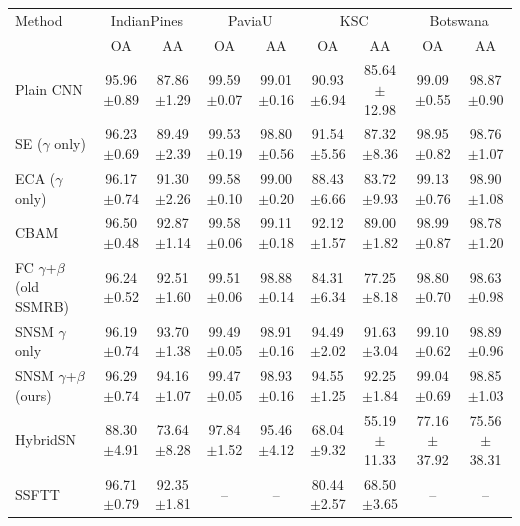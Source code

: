 \begin{tabular}{lcccccccc}
\toprule
Method & \multicolumn{2}{c}{IndianPines} & \multicolumn{2}{c}{PaviaU} & \multicolumn{2}{c}{KSC} & \multicolumn{2}{c}{Botswana} \\
 & OA & AA & OA & AA & OA & AA & OA & AA \\
\midrule
Plain CNN & 95.96$\pm$0.89 & 87.86$\pm$1.29 & 99.59$\pm$0.07 & 99.01$\pm$0.16 & 90.93$\pm$6.94 & 85.64$\pm$12.98 & 99.09$\pm$0.55 & 98.87$\pm$0.90 \\
SE ($\gamma$ only) & 96.23$\pm$0.69 & 89.49$\pm$2.39 & 99.53$\pm$0.19 & 98.80$\pm$0.56 & 91.54$\pm$5.56 & 87.32$\pm$8.36 & 98.95$\pm$0.82 & 98.76$\pm$1.07 \\
ECA ($\gamma$ only) & 96.17$\pm$0.74 & 91.30$\pm$2.26 & 99.58$\pm$0.10 & 99.00$\pm$0.20 & 88.43$\pm$6.66 & 83.72$\pm$9.93 & 99.13$\pm$0.76 & 98.90$\pm$1.08 \\
CBAM & 96.50$\pm$0.48 & 92.87$\pm$1.14 & 99.58$\pm$0.06 & 99.11$\pm$0.18 & 92.12$\pm$1.57 & 89.00$\pm$1.82 & 98.99$\pm$0.87 & 98.78$\pm$1.20 \\
FC $\gamma$+$\beta$ (old SSMRB) & 96.24$\pm$0.52 & 92.51$\pm$1.60 & 99.51$\pm$0.06 & 98.88$\pm$0.14 & 84.31$\pm$6.34 & 77.25$\pm$8.18 & 98.80$\pm$0.70 & 98.63$\pm$0.98 \\
SNSM $\gamma$ only & 96.19$\pm$0.74 & 93.70$\pm$1.38 & 99.49$\pm$0.05 & 98.91$\pm$0.16 & 94.49$\pm$2.02 & 91.63$\pm$3.04 & 99.10$\pm$0.62 & 98.89$\pm$0.96 \\
SNSM $\gamma$+$\beta$ (ours) & 96.29$\pm$0.74 & 94.16$\pm$1.07 & 99.47$\pm$0.05 & 98.93$\pm$0.16 & 94.55$\pm$1.25 & 92.25$\pm$1.84 & 99.04$\pm$0.69 & 98.85$\pm$1.03 \\
HybridSN & 88.30$\pm$4.91 & 73.64$\pm$8.28 & 97.84$\pm$1.52 & 95.46$\pm$4.12 & 68.04$\pm$9.32 & 55.19$\pm$11.33 & 77.16$\pm$37.92 & 75.56$\pm$38.31 \\
SSFTT & 96.71$\pm$0.79 & 92.35$\pm$1.81 & -- & -- & 80.44$\pm$2.57 & 68.50$\pm$3.65 & -- & -- \\
\bottomrule
\end{tabular}